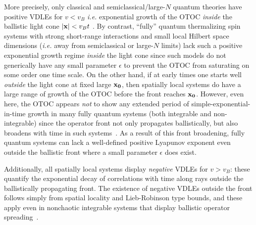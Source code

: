 \documentclass[aps,prl,reprint,superscriptaddress, longbibliography]{revtex4-1}
\newcommand{\vb}{v_B}
\begin{document}
More precisely, only classical and semiclassical/large-$N$ quantum theories have positive VDLEs  for $v< \vb$ \emph{i.e.} exponential growth of the OTOC \emph{inside} the ballistic light cone  $|{\bf x}| < \vb t$ . By contrast,  ``fully'' quantum thermalizing spin systems with strong short-range interactions and small local Hilbert space dimensions (\emph{i.e.} away from semiclassical or large-$N$ limits) lack such a positive exponential growth regime {\it inside} the light cone since such models do not generically have any small parameter $\epsilon$ to prevent the OTOC from saturating on some order one time scale.
On the other hand, if at early times one starts well \emph{outside} the light cone at fixed large ${\bf x_0}$, then spatially local systems do have a large range of growth of the OTOC before the front reaches ${\bf x_0}$. However, even here, the OTOC appears \emph{not} to show any extended period of simple-exponential-in-time growth in many fully quantum systems (both integrable and non-integrable) since the operator front not only propagates ballistically, but also broadens with  time in such systems~\cite{opspreadAdam, opspreadCurt}.  As a result of this front broadening, fully quantum systems can lack a well-defined positive Lyapunov exponent even outside the ballistic front where a small parameter $\epsilon$ does exist. 

Additionally, all spatially local systems display \emph{negative} VDLEs for  $v > \vb$: these quantify the exponential {decay} of correlations with time along rays {outside} the ballistically propagating front. The existence of negative VDLEs outside the front follows simply from spatial locality and Lieb-Robinson type bounds, and these apply even in nonchaotic integrable systems that display ballistic operator spreading~\cite{CalabreseCardy}. 
\end{document}
